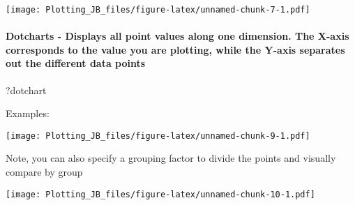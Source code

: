 \documentclass[]{article}
\newenvironment{Shaded}{\begin{snugshade}}{\end{snugshade}}
\newcommand{\CommentTok}[1]{\textcolor[rgb]{0.56,0.35,0.01}{\textit{#1}}}
\newcommand{\DataTypeTok}[1]{\textcolor[rgb]{0.13,0.29,0.53}{#1}}
\newcommand{\KeywordTok}[1]{\textcolor[rgb]{0.13,0.29,0.53}{\textbf{#1}}}
\newcommand{\NormalTok}[1]{#1}
\newcommand{\OperatorTok}[1]{\textcolor[rgb]{0.81,0.36,0.00}{\textbf{#1}}}
\let\oldparagraph\paragraph
\renewcommand{\paragraph}[1]{\oldparagraph{#1}\mbox{}}
\begin{document}
\texttt{[image: Plotting\_JB\_files/figure-latex/unnamed-chunk-7-1.pdf]}

\hypertarget{dotcharts---displays-all-point-values-along-one-dimension.-the-x-axis-corresponds-to-the-value-you-are-plotting-while-the-y-axis-separates-out-the-different-data-points}{%
\paragraph{Dotcharts - Displays all point values along one dimension.
The X-axis corresponds to the value you are plotting, while the Y-axis
separates out the different data
points}\label{dotcharts---displays-all-point-values-along-one-dimension.-the-x-axis-corresponds-to-the-value-you-are-plotting-while-the-y-axis-separates-out-the-different-data-points}}

\begin{Shaded}
\begin{Highlighting}[]
\NormalTok{?dotchart}
\end{Highlighting}
\end{Shaded}

Examples:

\begin{Shaded}
\end{Shaded}

\texttt{[image: Plotting\_JB\_files/figure-latex/unnamed-chunk-9-1.pdf]}

Note, you can also specify a grouping factor to divide the points and
visually compare by group

\begin{Shaded}
\end{Shaded}

\texttt{[image: Plotting\_JB\_files/figure-latex/unnamed-chunk-10-1.pdf]}

\begin{Shaded}
\end{Shaded}
\end{document}
